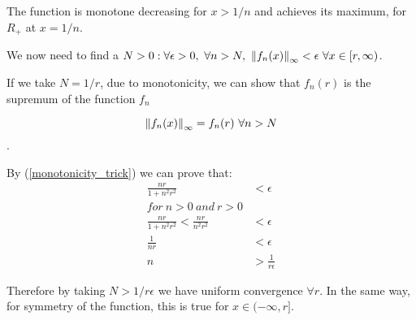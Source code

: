 \begin{homeworkProblem}
The function is monotone decreasing for $x > 1 / n$ and achieves its maximum, for $R_{+}$ at $x = 1 / n$.

We now need to find a $N > 0: \forall \epsilon > 0, \ \forall n > N, \ \left\lVert f_{n}(x)\right\rVert_{\infty} < \epsilon \ \forall x \in [r, \infty)$.

If we take $N = 1 / r$, due to monotonicity, we can show that $f_{n}(r)$ is the supremum of the function $f_{n}$

\begin{equation}
    \left\lVert f_{n}(x)\right\rVert_{\infty} = f_{n}(r) \  \forall n > N
\end{equation}.

By (\ref{monotonicity_trick}) we can prove that:
\begin{equation}
    \begin{split}
        \frac{nr}{1+n^{2}r^{2}} & < \epsilon \\
        for \ n > 0 \ and \ r > 0 \\
        \frac{nr}{1+n^{2}r^{2}} < \frac{nr}{n^{2} r^{2}}& < \epsilon\\
        \frac{1}{nr} & < \epsilon\\
        n & > \frac{1}{r \epsilon}        
    \end{split}
\end{equation}

Therefore by taking $N > 1 / r \epsilon$ we have uniform convergence $\forall r $. In the same way, for symmetry of the function, this is true for $x \in (-\infty, r]$.


\end{homeworkProblem}


